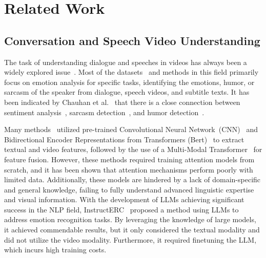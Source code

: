 \section{Related Work}
\label{sec:related work}

\subsection{Conversation and Speech Video Understanding}
The task of understanding dialogue and speeches in videos has always been a widely explored issue~\cite{han2021bi,liang2021multibench,zhang2021multi,4130374,10147343}. Most of the datasets~\cite{hasan2019ur,poria2018meld} and methods in this field primarily focus on emotion analysis for specific tasks, identifying the emotions, humor, or sarcasm of the speaker from dialogue, speech videos, and subtitle texts. It has been indicated by Chauhan et al.~\cite{chauhan2020sentiment} that there is a close connection between sentiment analysis~\cite{li2020multi,song2022supervised}, sarcasm detection~\cite{castro-etal-2019-towards}, and humor detection~\cite{islam2021multi}.

Many methods~\cite{chauhan2020sentiment,ray2022multimodal,hazarika2020misa} utilized pre-trained Convolutional Neural Network~(CNN)~\cite{li2021survey} and Bidirectional Encoder Representations from Transformers (Bert)~\cite{devlin2018bert} to extract textual and video features, followed by the use of a Multi-Modal Transformer~\cite{tsai2019multimodal} for feature fusion. However, these methods required training attention models from scratch, and it has been shown that attention mechanisms perform poorly with limited data. Additionally, these models are hindered by a lack of domain-specific and general knowledge, failing to fully understand advanced linguistic expertise and visual information. With the development of LLMs achieving significant success in the NLP field, InstructERC~\cite{lei2023instructerc} proposed a method using LLMs to address emotion recognition tasks. By leveraging the knowledge of large models, it achieved commendable results, but it only considered the textual modality and did not utilize the video modality. Furthermore, it required finetuning the LLM, which incurs high training costs.


